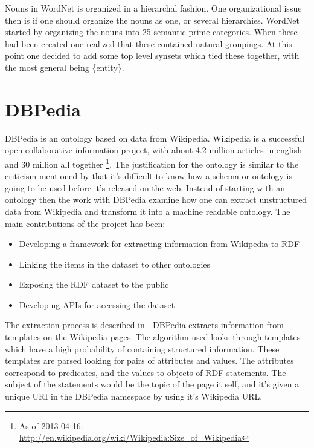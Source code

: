 
Nouns in WordNet is organized in a hierarchal fashion.
One organizational issue then is if one should organize the nouns as one, or several hierarchies.
WordNet started by organizing the nouns into 25 semantic prime categories.
When these had been created one realized that these contained natural groupings.
At this point one decided to add some top level synsets which tied these together,
with the most general being \{entity\}\citep{Miller1990a}.

\section{DBPedia}
DBPedia is an ontology based on data from Wikipedia.
Wikipedia is a successful open collaborative information project,
with about 4.2 million articles in english and 30 million all together
\footnote{As of 2013-04-16: \url{http://en.wikipedia.org/wiki/Wikipedia:Size_of_Wikipedia}}.
The justification for the ontology is similar to the criticism mentioned by \citet{Shirky2007}
that it's difficult to know how a schema or ontology is going to be used before it's released on the web.
Instead of starting with an ontology then the work with DBPedia examine how one can extract unstructured data
from Wikipedia and transform it into a machine readable ontology.
The main contributions of the project has been\citep{Auer2007}:

\begin{itemize}
	\item Developing a framework for extracting information from Wikipedia to RDF
	\item Linking the items in the dataset to other ontologies
	\item Exposing the RDF dataset to the public
	\item Developing APIs for accessing the dataset
\end{itemize}

The extraction process is described in \citet{Auer2007a}.
DBPedia extracts information from templates on the Wikipedia pages.
The algorithm used looks through templates which have a high probability of containing structured information.
These templates are parsed looking for pairs of attributes and values.
The attributes correspond to predicates, and the values to objects of RDF statements.
The subject of the statements would be the topic of the page it self,
and it's given a unique URI in the DBPedia namespace by using it's Wikipedia URL.

